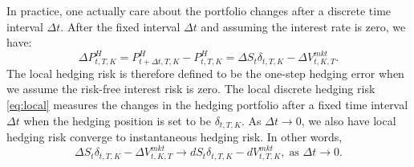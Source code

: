 \documentclass[letterpaper,12pt,titlepage,oneside,final]{book}
\numberwithin{equation}{section}
\theoremstyle{definition}
\newcommand{\DT}{\Delta t}
\newcommand{\Vmkt}{V^{mkt}}
\newcommand{\Smkt}{S}
\begin{document}
In practice, one actually care about the portfolio changes after a discrete time interval $\DT$.
After the fixed interval $\DT$  and assuming the interest rate is zero,
we have:
\begin{equation}
	\label{eq:localPL}
    \Delta P^{H}_{t,T,K}=P^{H}_{t+\DT,T,K}-P^{H}_{t,T,K}=\Delta \Smkt_{t}\delta_{t,T,K} -\Delta V^{mkt}_{t,K,T}.
\end{equation}
The local hedging risk is therefore defined to be the one-step hedging error when we assume the risk-free interest risk is zero. The local discrete hedging risk \eqref{eq:local} measures  the changes in the hedging portfolio after a fixed time interval $\DT$ when the hedging position is set to be $\delta_{t,T,K}$.  
 As $\DT \rightarrow 0$, we also have local hedging risk converge to instantaneous hedging risk. In other words,
\[
\Delta \Smkt_{t}\delta_{t,T,K} -\Delta V^{mkt}_{t,K,T} \rightarrow d\Smkt_{t}\delta_{t,T,K}-d \Vmkt_{t,T,K},\; \text{as }  \DT \rightarrow 0.
\]
\end{document}
